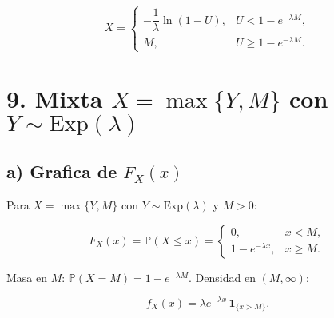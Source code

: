 \documentclass[10pt,a4paper]{article}
\begin{document}
\[
X=\begin{cases}
-\dfrac{1}{\lambda}\ln(1-U),&U<1-e^{-\lambda M},\\[6pt]
M,&U\ge 1-e^{-\lambda M}.
\end{cases}
\]

    \hypertarget{mixta-xmaxym-con-ysimmathrmexplambda}{%
\section{\texorpdfstring{9. Mixta \(X=\max\{Y,M\}\) con
\(Y\sim\mathrm{Exp}(\lambda)\)}{9. Mixta X=\textbackslash max\textbackslash\{Y,M\textbackslash\} con Y\textbackslash sim\textbackslash mathrm\{Exp\}(\textbackslash lambda)}}\label{mixta-xmaxym-con-ysimmathrmexplambda}}

    \hypertarget{a-grafica-de-f_xx}{%
\subsection{\texorpdfstring{a) Grafica de
\(F_X(x)\)}{a) Grafica de F\_X(x)}}\label{a-grafica-de-f_xx}}

    Para \(X=\max\{Y,M\}\) con \(Y\sim\mathrm{Exp}(\lambda)\) y \(M>0\):

\[
F_X(x)=\mathbb P(X\le x)=
\begin{cases}
0,& x<M,\\[4pt]
1-e^{-\lambda x},& x\ge M.
\end{cases}
\]

Masa en \(M\): \(\mathbb P(X=M)=1-e^{-\lambda M}\). Densidad en
\((M,\infty)\):

\[
f_X(x)=\lambda e^{-\lambda x}\,\mathbf 1_{\{x>M\}}.
\]
\end{document}
